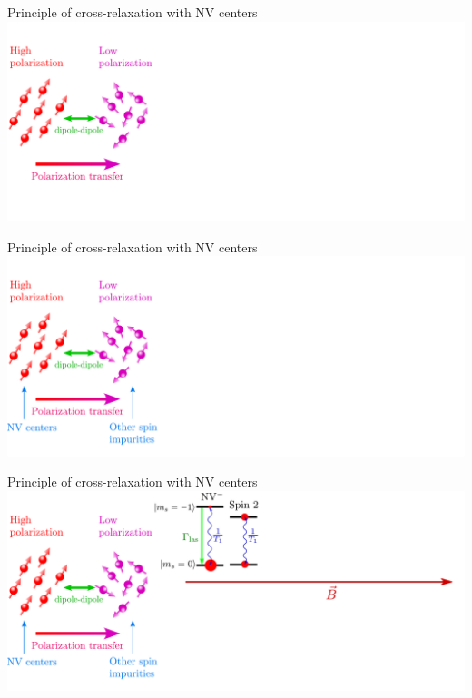 \documentclass{beamer}
\begin{document}
\begin{frame}{Principle of cross-relaxation with NV centers}
\centering
\includegraphics[width=\textwidth,height=0.8\textheight,keepaspectratio]{Slide_CR_presentation_f-5}
\end{frame}

\begin{frame}{Principle of cross-relaxation with NV centers}
\centering
\includegraphics[width=\textwidth,height=0.8\textheight,keepaspectratio]{Slide_CR_presentation_f-4}
\end{frame}

\begin{frame}{Principle of cross-relaxation with NV centers}
\centering
\includegraphics[width=\textwidth,height=0.8\textheight,keepaspectratio]{Slide_CR_presentation_f-3}
\end{frame}
\end{document}
